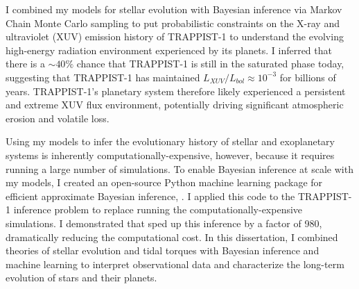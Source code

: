 {I combined my models for stellar evolution with Bayesian inference via Markov Chain Monte Carlo sampling to put probabilistic constraints on the X-ray and ultraviolet (XUV) emission history of TRAPPIST-1 to understand the evolving high-energy radiation environment experienced by its planets. I inferred that there is a ${\sim}40\%$ chance that TRAPPIST-1 is still in the saturated phase today, suggesting that TRAPPIST-1 has maintained $L_{XUV}/L_{bol} \approx 10^{-3}$ for billions of years. TRAPPIST-1's planetary system therefore likely experienced a persistent and extreme XUV flux environment, potentially driving significant atmospheric erosion and volatile loss. 

Using my models to infer the evolutionary history of stellar and exoplanetary systems is inherently computationally-expensive, however, because it requires running a large number of simulations. To enable Bayesian inference at scale with my models, I created an open-source Python machine learning package for efficient approximate Bayesian inference, \approxposterior. I applied this code to the TRAPPIST-1 inference problem to replace running the computationally-expensive \vplanet simulations. I demonstrated that \approxposterior sped up this inference by a factor of 980, dramatically reducing the computational cost.  In this dissertation, I combined theories of stellar evolution and tidal torques with Bayesian inference and machine learning to interpret observational data and characterize the long-term evolution of stars and their planets.}
